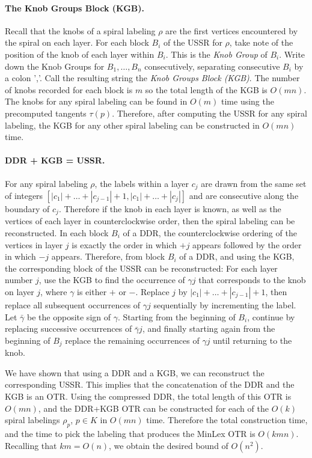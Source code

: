 \documentclass[leqno,12pt]{article}
\begin{document}
\paragraph{The Knob Groups Block (KGB).}
Recall that the knobs of a spiral labeling $\rho$ are the first vertices
encountered by the spiral on each layer.
For each block $B_i$ of the USSR for $\rho$, take note of the position
of the knob of each layer within $B_i$. This is the {\em Knob Group} of
$B_i$. Write down the Knob Groups for $B_1,\ldots,B_n$ consecutively,
separating consecutive $B_i$ by a colon ','. Call the resulting string
the \emph{Knob Groups Block (KGB)}.
The number of knobs recorded for each block is $m$ so the total length
of the KGB is $O(mn)$. 
The knobs for any spiral labeling can be found in $O(m)$ time using
the precomputed tangents $\tau(p)$. Therefore, after computing the
USSR for any spiral labeling, the KGB for any other spiral labeling
can be constructed in $O(mn)$ time.\\

\paragraph{DDR + KGB = USSR.}
For any spiral labeling $\rho$, the labels within a layer $c_j$ 
are drawn from the same set of integers
$[|c_1|+\ldots+|c_{j-1}|+1,  |c_1|+\ldots+|c_j|]$ and are consecutive
along the boundary of $c_j$. Therefore if the knob in each layer is
known, as well as the vertices of each layer in counterclockwise
order, then the spiral labeling can be reconstructed.
In each block $B_i$ of a DDR, the counterclockwise ordering of the
vertices in layer $j$ is exactly the order in which $+j$ appears
followed by the order in which $-j$ appears. Therefore, from block
$B_i$ of a DDR, and using the KGB, the corresponding block of the USSR
can be reconstructed: For each layer number $j$, use the KGB to find
the occurrence of $\gamma j$ that corresponds to the knob on layer
$j$, where $\gamma$ is either $+$ or $-$. Replace $j$ by 
$|c_1|+\ldots+|c_{j-1}|+1$, then replace all subsequent occurrences of
$\gamma j$ sequentially by incrementing the label. 
Let $\bar\gamma$ be the opposite sign of $\gamma$. Starting from the
beginning of $B_i$, continue by replacing successive occurrences of 
$\bar\gamma j$, and finally starting again from the beginning of $B_j$
replace the remaining occurrences of $\gamma j$ until returning to the
knob. 

We have  shown that using a DDR and a KGB, we can reconstruct the
corresponding USSR. This implies that the concatenation of the DDR and
the KGB is an OTR. Using the compressed DDR, the
total length of this OTR is $O(mn)$, and the DDR+KGB OTR can be
constructed for each of the $O(k)$ spiral labelings $\rho_p$, $p\in K$
in $O(mn)$ time. Therefore the total construction time, and the time
to pick the labeling that produces the MinLex OTR is 
$O(kmn)$.  Recalling that $km=O(n)$, we obtain the desired bound of $O(n^2)$.
\end{document}
